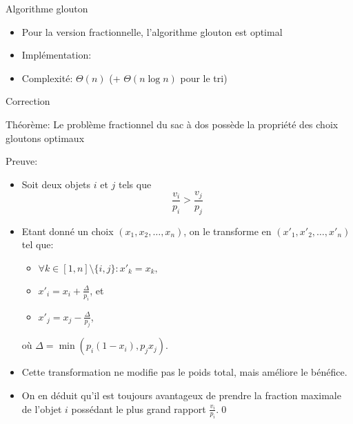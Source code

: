 \begin{frame}{Algorithme glouton}

\begin{itemize}
\item Pour la version fractionnelle, l'algorithme glouton est optimal
\item Implémentation:

\bigskip

{\small
\begin{center}
\end{center}
}
\bigskip

\item Complexité: $\Theta(n)$ (+ $\Theta(n\log n)$ pour le tri)
\end{itemize}

\end{frame}

\begin{frame}{Correction}

\alert{Théorème:} Le problème fractionnel du sac à dos possède la propriété des choix gloutons optimaux

\bigskip

\alert{Preuve:}
\begin{itemize}
\item Soit deux objets $i$ et $j$ tels que
$$\frac{v_i}{p_i}>\frac{v_j}{p_j}$$
\item Etant donné un choix $(x_1,x_2,\ldots,x_n)$, on le transforme en $(x'_1,x'_2,\ldots, x'_n)$ tel que:
\begin{itemize}
\item $\forall k\in [1,n]\setminus\{i,j\}: x'_k=x_k,$
\item $x'_i=x_i+\frac{\Delta}{p_i}$, et
\item $x'_j=x_j-\frac{\Delta}{p_j}$,
\end{itemize}
où $\Delta=\min(p_i(1-x_i),p_jx_j)$.
\item Cette transformation ne modifie pas le poids total, mais améliore le bénéfice.
\item On en déduit qu'il est toujours avantageux de prendre la fraction maximale de l'objet $i$ possédant le plus grand rapport $\frac{v_i}{p_i}$.\qed
\end{itemize}

\end{frame}

